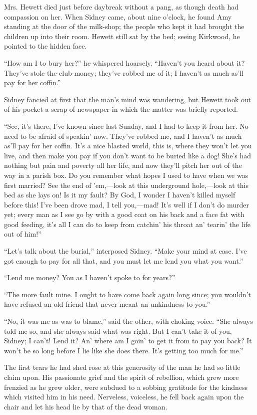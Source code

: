 Mrs. Hewett died just before daybreak {}without a pang, as though death
had compassion on her. When Sidney came, about nine o'clock, he found
Amy standing at the door of the milk-shop; the people who kept it had
brought the children up into their room. Hewett still sat by the bed;
seeing Kirkwood, he pointed to the hidden face.

``How am I to bury her?'' he whispered hoarsely. ``Haven't you heard
about it? They've stole the club-money; they've robbed me of it; I
haven't as much as'll pay for her coffin.''

Sidney fancied at first that the man's mind was wandering, but Hewett
took out of his pocket a scrap of newspaper in which the matter was
briefly reported.

``See, it's there, I've known since last Sunday, and I had to keep it
from her. No need to be afraid of speakin' now. They've robbed me, and I
haven't as much as'll pay for her coffin. It's a nice blasted world,
this is, where they won't let you live, and then make you pay if you
don't want to be buried like a dog! She's had nothing but pain and
{}poverty all her life, and now they'll pitch her out of the way in a
parish box. Do you remember what hopes I used to have when we was first
married? See the end of 'em,---look at this underground hole,---look at
this bed as she lays on! Is it my fault? By God, I wonder I haven't
killed myself before this! I've been drove mad, I tell you,---mad! It's
well if I don't do murder yet; every man as I see go by with a good coat
on his back and a face fat with good feeding, it's all I can do to keep
from catchin' his throat an' tearin' the life out of him!''

``Let's talk about the burial,'' interposed Sidney. ``Make your mind at
ease. I've got enough to pay for all that, and you must let me lend you
what you want.''

``Lend me money? You as I haven't spoke to for years?''

``The more fault mine. I ought to have come back again long since; you
wouldn't have refused an old friend that never meant an unkindness to
you.''

``No, it was me as was to blame,'' said the {}other, with choking voice.
``She always told me so, and she always said what was right. But I can't
take it of you, Sidney; I can't! Lend it? An' where am I goin' to get it
from to pay you back? It won't be so long before I lie like she does
there. It's getting too much for me.''

The first tears he had shed rose at this generosity of the man he had so
little claim upon. His passionate grief and the spirit of rebellion,
which grew more frenzied as he grew older, were subdued to a sobbing
gratitude for the kindness which visited him in his need. Nerveless,
voiceless, he fell back again upon the chair and let his head lie by
that of the dead woman.
